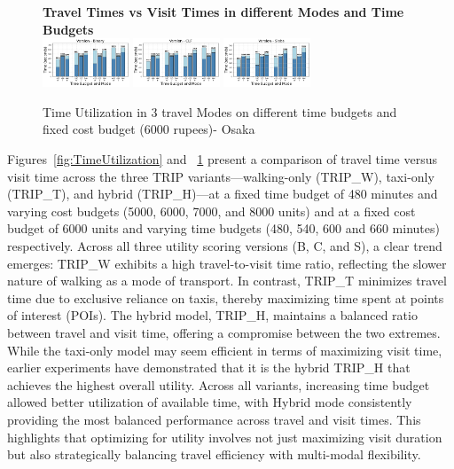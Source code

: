 \begin{figure}[th]
\textbf{Travel Times vs Visit Times in different Modes and Time Budgets}\\
\includegraphics[width=0.23\textwidth]{plots/TIME_UTILIZATION_BINARY1.png}
\includegraphics[width=0.23\textwidth]{plots/TIME_UTILIZATION_CLF1.png}
\includegraphics[width=0.23\textwidth]{plots/TIME_UTILIZATION_SLABS1.png}
\hspace{8pt}
\caption{Time Utilization in 3 travel Modes on different time budgets and fixed cost budget (6000 rupees)- Osaka}
\label{fig:TimeUtilization1}
\end{figure}

Figures~\ref{fig:TimeUtilization} and ~\ref{fig:TimeUtilization1} present a comparison of travel time versus visit time across the three TRIP variants---walking-only (TRIP\_W), taxi-only (TRIP\_T), and hybrid (TRIP\_H)---at a fixed time budget of 480 minutes and varying cost budgets (5000, 6000, 7000, and 8000 units) and at a fixed cost budget of 6000 units and varying time budgets (480, 540, 600 and 660 minutes) respectively. Across all three utility scoring versions (B, C, and S), a clear trend emerges: TRIP\_W exhibits a high travel-to-visit time ratio, reflecting the slower nature of walking as a mode of transport. In contrast, TRIP\_T minimizes travel time due to exclusive reliance on taxis, thereby maximizing time spent at points of interest (POIs). The hybrid model, TRIP\_H, maintains a balanced ratio between travel and visit time, offering a compromise between the two extremes. While the taxi-only model may seem efficient in terms of maximizing visit time, earlier experiments have demonstrated that it is the hybrid TRIP\_H that achieves the highest overall utility. Across all variants, increasing time budget allowed better utilization of available time, with Hybrid mode consistently providing the most balanced performance across travel and visit times. This highlights that optimizing for utility involves not just maximizing visit duration but also strategically balancing travel efficiency with multi-modal flexibility.\\

